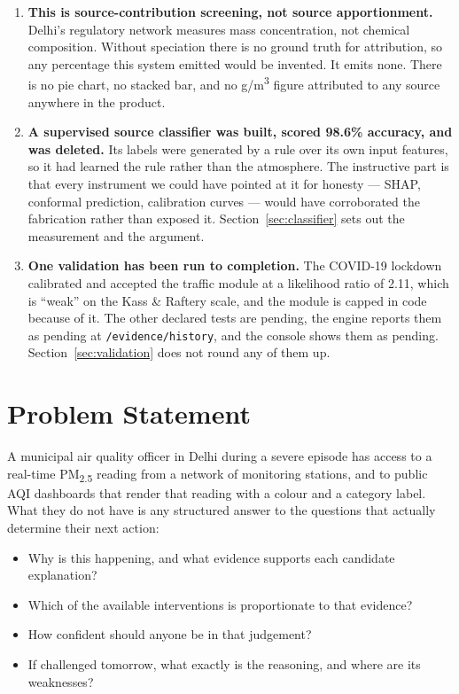 \documentclass[11pt,a4paper]{article}
\newcommand{\code}[1]{\texttt{\small #1}}
\newcommand{\PM}{PM\textsubscript{2.5}}
\newcommand{\ugm}{\textmu g/m\textsuperscript{3}}
\begin{document}
\begin{enumerate}
  \item \textbf{This is source-contribution screening, not source apportionment.}
  Delhi's regulatory network measures mass concentration, not chemical composition.
  Without speciation there is no ground truth for attribution, so any percentage
  this system emitted would be invented. It emits none. There is no pie chart, no
  stacked bar, and no \ugm{} figure attributed to any source anywhere in the
  product.

  \item \textbf{A supervised source classifier was built, scored 98.6\% accuracy,
  and was deleted.} Its labels were generated by a rule over its own input
  features, so it had learned the rule rather than the atmosphere. The instructive
  part is that every instrument we could have pointed at it for honesty --- SHAP,
  conformal prediction, calibration curves --- would have corroborated the
  fabrication rather than exposed it. Section~\ref{sec:classifier} sets out the
  measurement and the argument.

  \item \textbf{One validation has been run to completion.} The COVID-19 lockdown
  calibrated and accepted the traffic module at a likelihood ratio of 2.11, which
  is ``weak'' on the Kass \& Raftery scale, and the module is capped in code
  because of it. The other declared tests are pending, the engine reports them as
  pending at \code{/evidence/history}, and the console shows them as pending.
  Section~\ref{sec:validation} does not round any of them up.
\end{enumerate}

\section{Problem Statement}

A municipal air quality officer in Delhi during a severe episode has access to a
real-time \PM{} reading from a network of monitoring stations, and to public AQI
dashboards that render that reading with a colour and a category label. What they
do not have is any structured answer to the questions that actually determine their
next action:

\begin{itemize}
  \item Why is this happening, and what evidence supports each candidate
  explanation?
  \item Which of the available interventions is proportionate to that evidence?
  \item How confident should anyone be in that judgement?
  \item If challenged tomorrow, what exactly is the reasoning, and where are its
  weaknesses?
\end{itemize}
\end{document}
